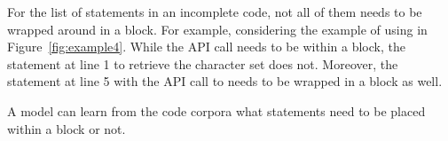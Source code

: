 For the list of statements in an incomplete code, not all of them
needs to be wrapped around in a  block. For example,
considering the example of using  in
Figure~\ref{fig:example4}. While the API call
 needs to be within a
 block, the statement at line 1 to retrieve the
character set does not. Moreover, the statement at line 5 with the API
call to  needs to be wrapped in a 
block as well.



\begin{Observation} 
\label{ob5}
  A model can learn from the code corpora what statements need to be placed
  within a  block or not.
\end{Observation}
